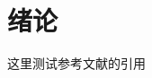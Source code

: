 \documentclass[\main/main.tex]{subfiles}
\begin{document}
\section{绪论}

\zhlipsum[1]

这里测试参考文献的引用\cite{XiaChangLiangYongCiWuShuaZhiLiuDianJiJiQiKongZhi2012, ZhangJiaWeiSiZuJiQiRenYongZhouXiangCiTongYongCiDianJiSheJiYuFenXi2024}

\zhlipsum[2]
\end{document}
